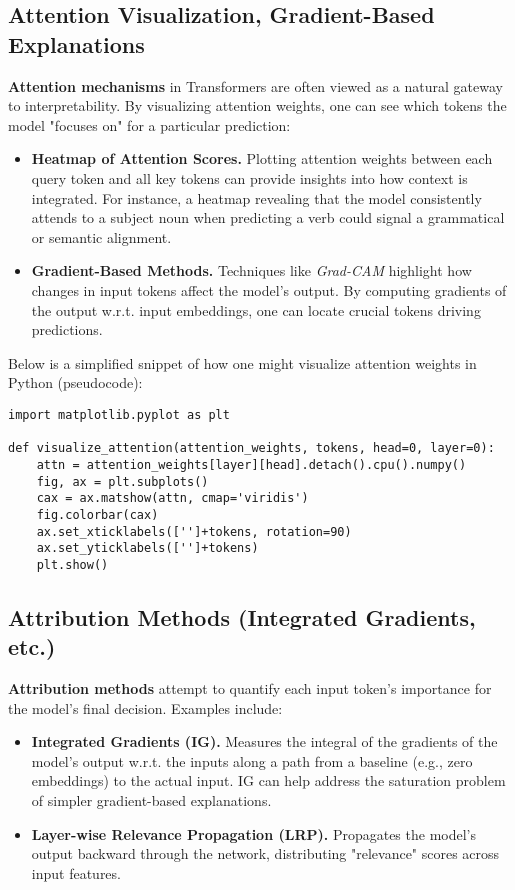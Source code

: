 \subsection{Attention Visualization, Gradient-Based Explanations}
\noindent
\textbf{Attention mechanisms} in Transformers are often viewed as a natural gateway to interpretability. By visualizing attention weights, one can see which tokens the model "focuses on" for a particular prediction:
\begin{itemize}
    \item \textbf{Heatmap of Attention Scores.} Plotting attention weights between each query token and all key tokens can provide insights into how context is integrated. For instance, a heatmap revealing that the model consistently attends to a subject noun when predicting a verb could signal a grammatical or semantic alignment.
    \item \textbf{Gradient-Based Methods.} Techniques like \emph{Grad-CAM} highlight how changes in input tokens affect the model's output. By computing gradients of the output w.r.t. input embeddings, one can locate crucial tokens driving predictions.
\end{itemize}

\noindent
Below is a simplified snippet of how one might visualize attention weights in Python (pseudocode):

\begin{verbatim}
import matplotlib.pyplot as plt

def visualize_attention(attention_weights, tokens, head=0, layer=0):
    attn = attention_weights[layer][head].detach().cpu().numpy()
    fig, ax = plt.subplots()
    cax = ax.matshow(attn, cmap='viridis')
    fig.colorbar(cax)
    ax.set_xticklabels(['']+tokens, rotation=90)
    ax.set_yticklabels(['']+tokens)
    plt.show()
\end{verbatim}

\subsection{Attribution Methods (Integrated Gradients, etc.)}
\noindent
\textbf{Attribution methods} attempt to quantify each input token's importance for the model's final decision. Examples include:
\begin{itemize}
    \item \textbf{Integrated Gradients (IG).} Measures the integral of the gradients of the model's output w.r.t. the inputs along a path from a baseline (e.g., zero embeddings) to the actual input. IG can help address the saturation problem of simpler gradient-based explanations.
    \item \textbf{Layer-wise Relevance Propagation (LRP).} Propagates the model's output backward through the network, distributing "relevance" scores across input features.
\end{itemize}

